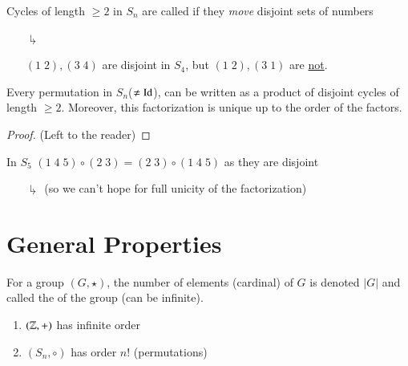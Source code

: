 \documentclass[12pt, a4paper, oneside, openright, titlepage]{book}
\begin{document}
\begin{defn}
    Cycles of length $\geq 2$ in $S_n$ are called  if they \emph{move} disjoint sets of numbers
    \begin{enumerate}
        \item[$\drsh$] \begin{eg}
            $(1\;2), (3\;4)$ are disjoint in $S_4$, but $(1\;2),(3\;1)$ are \underline{not}.
        \end{eg} 
    \end{enumerate}
\end{defn}


\begin{rmk}
    Every permutation in $S_n$($\neq \operatorname{Id}$), can be written as a product of disjoint cycles of length $\geq 2$. Moreover, this factorization is unique up to the order of the factors.
    \begin{proof}
        (Left to the reader)
    \end{proof}
\end{rmk}

\begin{eg}
    In $S_5$ $(1\;4\;5)\circ(2\;3) = (2\;3) \circ(1\;4\;5)$ as they are disjoint
    \begin{enumerate}
        \item[$\drsh$] (so we can't hope for full unicity of the factorization) 
    \end{enumerate}
\end{eg}


\section{\textsection General Properties}

\begin{defn}
    For a group $(G, \star)$, the number of elements (cardinal) of $G$ is denoted $|G|$ and called the  of the group (can be infinite).
\end{defn}

\begin{eg}
    \begin{enumerate}
        \item $(\mathbb Z,+)$ has infinite order
        \item $(S_n,\circ)$ has order $n!$ (permutations)
    \end{enumerate}
\end{eg}
\end{document}
